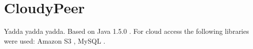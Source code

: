 \chapter{CloudyPeer}
Yadda yadda yadda. Based on Java 1.5.0 \cite{JDK5Documentation}. For
cloud access the following libraries were used: Amazon S3
\cite{AWS4Java}, MySQL \cite{MySQLConnectorJava}.
